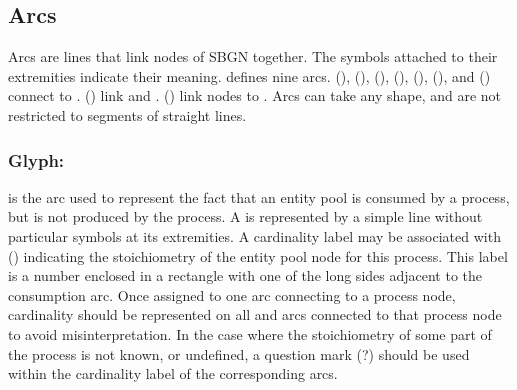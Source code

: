 
\subsection{Arcs}\label{sec:arcs}

Arcs are lines that link nodes of SBGN together. The symbols attached to their extremities indicate their meaning. \SBGNPDLone defines nine arcs.  (),  (),  (),  (),  (),  (), and  () connect  to .  () link  and .   () link nodes to . Arcs can take any shape, and are not restricted to segments of straight lines.



\subsubsection{Glyph: }
\label{sec:consumption}

 is the arc used to represent the fact that an entity pool is consumed by a process, but is not produced by the process. A  is represented by a simple line without particular symbols at its extremities. A cardinality label may be associated with  () indicating the stoichiometry of the entity pool node for this process. This label is a number enclosed in a rectangle with one of the long sides adjacent to the consumption arc. Once assigned to one arc connecting to a process node, cardinality should be represented on all  and  arcs connected to that process node to avoid misinterpretation. In the case where the stoichiometry of some part of the process is not known, or undefined, a question mark (?) should be used within the cardinality label
of the corresponding arcs.

